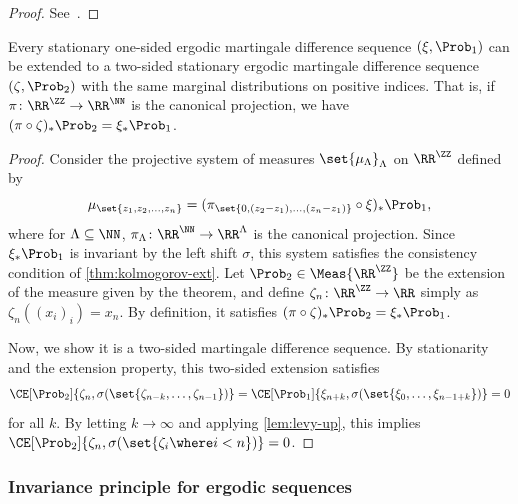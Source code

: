 \documentclass[../main]{subfiles}
\begin{document}
\begin{proof}
  See~\cite{billingsleyProbabilityMeasure1995}.
\end{proof}

\begin{lemma}\label{lem:two-sided-from-one}
  Every stationary one-sided ergodic martingale difference sequence \((\xi, \Prob_1)\) can be extended to a two-sided stationary ergodic martingale difference sequence \((\zeta, \Prob_2)\) with the same marginal distributions on positive indices. That is, if \(\pi \colon \RR^{\ZZ}\to \RR^{\NN}\) is the canonical projection, we have \((\pi \circ \zeta)_*\Prob_2 = \xi_*\Prob_1\).
\end{lemma}

\begin{proof}
  Consider the projective system of measures \(\set{\mu_{\Lambda}}_{\Lambda}\) on \(\RR^{\ZZ}\) defined by
  \begin{equation*}
    \mu_{\set{z_1,z_2,\dots,z_n}} = (\pi_{\set{0, (z_2 - z_1),\dots,(z_n - z_1)}} \circ \xi)_*\Prob_1,
  \end{equation*}
  where for \(\Lambda \subseteq \NN\), \(\pi_{\Lambda} \colon \RR^{\NN}\to \RR^{\Lambda}\) is the canonical projection. Since \(\xi_*\Prob_1\) is invariant by the left shift \(\sigma\), this system satisfies the consistency condition of \cref{thm:kolmogorov-ext}. Let \(\Prob_2 \in \Meas{\RR^{\ZZ}}\) be the extension of the measure given by the theorem, and define \(\zeta_n \colon \RR^{\ZZ} \to \RR\) simply as \(\zeta_n((x_i)_i) = x_n\). By definition, it satisfies \((\pi \circ \zeta)_*\Prob_2 = \xi_*\Prob_1\).

  Now, we show it is a two-sided martingale difference sequence. By stationarity and the extension property, this two-sided extension satisfies
  \begin{equation*}
    \CE[\Prob_2]{\zeta_{n}, {\sigma(\set{\zeta_{n - k},\dots,\zeta_{n - 1}})}} = 
    \CE[\Prob_1]{\xi_{n + k}, {\sigma(\set{\xi_{0},\dots,\xi_{n - 1 + k}})}} = 0
  \end{equation*}
  for all \(k\). By letting \(k \to \infty\) and applying \cref{lem:levy-up}, this implies \(\CE[\Prob_2]{\zeta_{n}, {\sigma(\set{\zeta_i \where i < n})}} = 0\).
\end{proof}


\subsubsection{Invariance principle for ergodic sequences}
\end{document}
